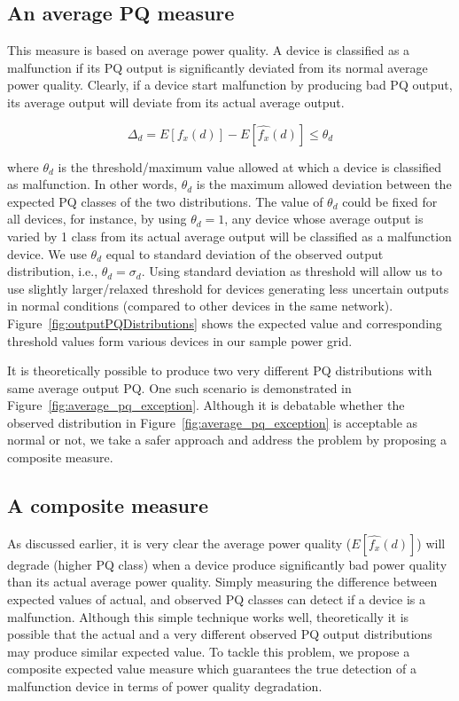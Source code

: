 \documentclass[12pt,oneside]{book}
\begin{document}
\subsection{An average PQ measure}
This measure is based on average power quality. A device is classified as a malfunction if its PQ output is significantly deviated from its normal average power quality. Clearly, if a device start malfunction by producing bad PQ output, its average output will deviate from its actual average output.

\[\Delta_d = E[f_x(d)] - E[\widehat {f_x}(d)] \leq \theta_d \]

\noindent where $\theta_d$ is the threshold/maximum value allowed at which a device is classified as malfunction. In other words, $\theta_d$ is the maximum allowed deviation between the expected PQ classes of the two distributions. The value of $\theta_d$ could be fixed for all devices, for instance, by using $\theta_d = 1$, any device whose average output is varied by 1 class from its actual average output will be classified as a malfunction device. We use $\theta_d$ equal to standard deviation of the observed output distribution, i.e., $\theta_d=\sigma_d$. Using standard deviation as threshold will allow us to use slightly larger/relaxed threshold for devices generating less uncertain outputs in normal conditions (compared to other devices in the same network). Figure~\ref{fig:outputPQDistributions} shows the expected value and corresponding threshold values form various devices in our sample power grid.

It is theoretically possible to produce two very different PQ distributions with same average output PQ.  One such scenario is demonstrated in Figure~\ref{fig:average_pq_exception}. Although it is debatable whether the observed distribution in Figure~\ref{fig:average_pq_exception} is acceptable as normal or not, we take a safer approach and address the problem by proposing a composite measure.

\subsection{A composite measure}
As discussed earlier, it is very clear the average power quality ($E[\widehat{f_x}(d)]$) will degrade (higher PQ class) when a device produce significantly bad power quality than its actual average power quality. Simply measuring the difference between expected values of actual, and observed PQ classes can detect if a device is a malfunction. Although this simple technique works well, theoretically it is possible that the actual and a very different observed PQ output distributions may produce similar expected value. To tackle this problem, we propose a composite expected value measure which guarantees the true detection of a malfunction device in terms of power quality degradation.
\end{document}
